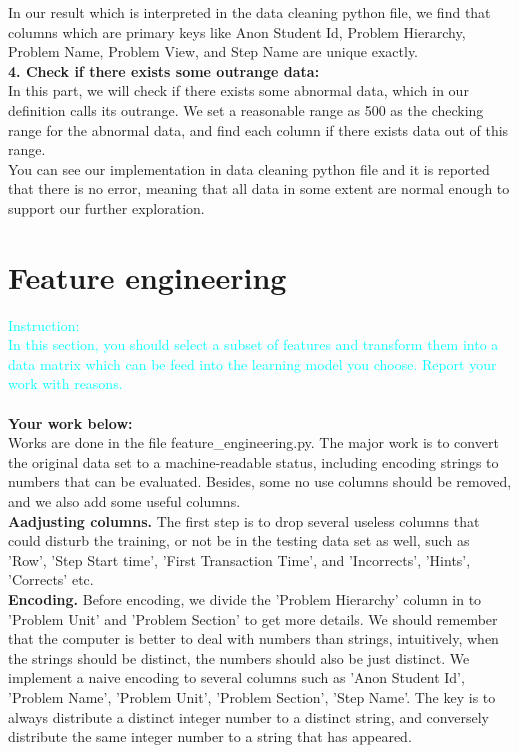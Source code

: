\documentclass{article}
\begin{document}
In our result which is interpreted in the data cleaning python file, we find that columns which are primary keys
like Anon Student Id, Problem Hierarchy, Problem Name, Problem View, and Step Name are unique exactly. \\
\textbf{4. Check if there exists some outrange data:} \\
In this part, we will check if there exists some abnormal data, which in our definition calls its outrange.
We set a reasonable range as 500 as the checking range for the abnormal data, and find each column if there exists data out of this range.\\
You can see our implementation in data cleaning python file and it is reported that there is no error, meaning that all data
in some extent are normal enough to support our further exploration.
\section{Feature engineering}
\textcolor{cyan}{Instruction: \\
  In this section, you should select a subset of features and transform them into a data matrix which can be feed into the learning model you choose. Report your work with reasons.}\\\\
\textbf{Your work below:}\\
Works are done in the file feature\_engineering.py. The major work is to convert the original data set to a machine-readable status, including encoding strings to numbers that can be evaluated. Besides, some no use columns should be removed, and we also add some useful columns.\\
\textbf{Aadjusting columns.}
The first step is to drop several useless columns that could disturb the training, or not be in the testing data set as well, such as 'Row', 'Step Start time', 'First Transaction Time', and 'Incorrects', 'Hints', 'Corrects' etc. \\
\textbf{Encoding.}
Before encoding, we divide the 'Problem Hierarchy' column in to 'Problem Unit' and 'Problem Section' to get more details.
We should remember that the computer is better to deal with numbers than strings, intuitively, when the strings should be distinct, the numbers should also be just distinct. We implement a naive encoding to several columns such as 'Anon Student Id', 'Problem Name',
'Problem Unit', 'Problem Section',
'Step Name'.
The key is to always distribute a distinct integer number to a distinct string, and conversely distribute the same integer number to a string that has appeared.\\
\end{document}

